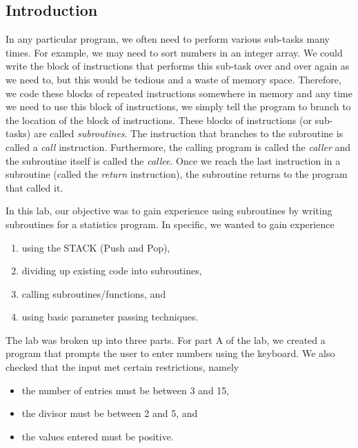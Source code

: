 \documentclass[10pt, letterpaper, titlepage]{article} %
\title{\textbf{\Huge{
\begin{center}
Introduction to\\ Subroutines \\ 😂😂😂 \\
\end{center}
}}}
\author{\B enjamin Kong | 1573684\\Lora Ma ||||| 1570935\\ \\ECE 212 Lab Section H11}
\begin{document}
 
\maketitle 
\thispagestyle{empty}
\tableofcontents 
\newpage
{}

\begin{multicols*}{2}


\section{Introduction}
In any particular program, we often need to perform various sub-tasks many times. 
For example, we may need to sort numbers in an integer array. 
We could write the block of instructions that performs this sub-task over and over again as we need to, but this would be tedious and a waste of memory space. 
Therefore, we code these blocks of repeated instructions somewhere in memory and any time we need to use this block of instructions, we simply tell the program to branch to the location of the block of instructions. 
These blocks of instructions (or sub-tasks) are called \textit{subroutines}. 
The instruction that branches to the subroutine is called a \textit{call} instruction. 
Furthermore, the calling program is called the \textit{caller} and the subroutine itself is called the \textit{callee}. 
Once we reach the last instruction in a subroutine (called the \textit{return} instruction), the subroutine returns to the program that called it. 

In this lab, our objective was to gain experience using subroutines by writing subroutines for a statistics program. 
In specific, we wanted to gain experience
\begin{enumerate}
\item using the STACK (Push and Pop),
\item dividing up existing code into subroutines,
\item calling subroutines/functions, and
\item using basic parameter passing techniques.
\end{enumerate}
The lab was broken up into three parts. 
For part A of the lab, we created a program that prompts the user to enter numbers using the keyboard. 
We also checked that the input met certain restrictions, namely
\begin{itemize}
\item the number of entries must be between 3 and 15,
\item the divisor must be between 2 and 5, and
\item the values entered must be positive.
\end{itemize}


\end{multicols*}
\end{document}

